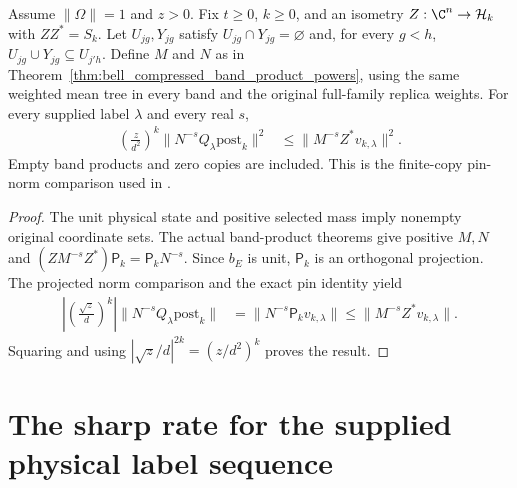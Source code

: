 \begin{theorem}
    \label{thm:selected_bell_post_inverse_transport}
    \leanok
    Assume $\|\Omega\|=1$ and $z>0$. Fix $t\ge0$, $k\ge0$, and an
    isometry $Z:\C^n\to\mathcal H_k$ with $ZZ^*=S_k$.
    Let $U_{jg},Y_{jg}$ satisfy $U_{jg}\cap Y_{jg}=\varnothing$ and,
    for every $g<h$, $U_{jg}\cup Y_{jg}\subseteq U_{j'h}$.
    Define $M$ and $N$ as in
    Theorem~\ref{thm:bell_compressed_band_product_powers}, using the same
    weighted mean tree in every band and the original full-family
    replica weights. For every supplied label $\lambda$ and every
    real $s$,
    \begin{align*}
        \left(\frac z{d^2}\right)^k
          \|N^{-s}Q_\lambda\mathrm{post}_k\|^2
        &\le\|M^{-s}Z^*v_{k,\lambda}\|^2.
    \end{align*}
    Empty band products and zero copies are included. This is the
    finite-copy pin-norm comparison used in
    \cite[\texttt{07-comparators.tex}, lines 283--308 and 383--418]{OpenAI2026AreaLaw}.
\end{theorem}
\begin{proof}
    \leanok
    The unit physical state and positive selected mass imply nonempty
    original coordinate sets. The actual band-product theorems give
    positive $M,N$ and
    $(ZM^{-s}Z^*)\mathsf P_k=\mathsf P_kN^{-s}$.
    Since $b_E$ is unit, $\mathsf P_k$ is an orthogonal projection.
    The projected norm comparison and the exact pin identity yield
    \begin{align*}
        \left|\left(\frac{\sqrt z}{d}\right)^k\right|
          \|N^{-s}Q_\lambda\mathrm{post}_k\|
        &=\|N^{-s}\mathsf P_kv_{k,\lambda}\|
          \le\|M^{-s}Z^*v_{k,\lambda}\|.
    \end{align*}
    Squaring and using $|\sqrt z/d|^{2k}=(z/d^2)^k$ proves the result.
\end{proof}

\section{The sharp rate for the supplied physical label sequence}
\label{sec:physical_sharp_supplied_sequence}

